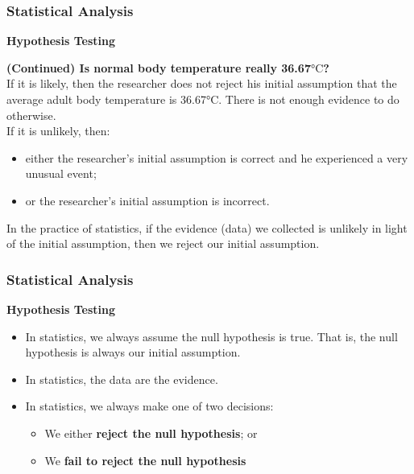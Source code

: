 \documentclass{beamer}
\begin{document}

\begin{frame}
\frametitle{Statistical Analysis}
\textbf{Hypothesis Testing}\\
\begin{example}
\textbf{(Continued) Is normal body temperature really 36.67$\si{\degreeCelsius}$?}\\
\vspace{0.1cm}
If it is likely, then the researcher does not reject his initial assumption that the average adult body temperature is 36.67$\si{\degreeCelsius}$. There is not enough evidence to do otherwise.\\
\vspace{0.1cm}
If it is unlikely, then:
\begin{itemize}
\item either the researcher's initial assumption is correct and he experienced a very unusual event;
\item or the researcher's initial assumption is incorrect.
\end{itemize}
\vspace{0.1cm}
In the practice of statistics, if the evidence (data) we collected is unlikely in light of the initial assumption, then we reject our initial assumption.
\end{example}
\end{frame}


\begin{frame}
\frametitle{Statistical Analysis}
\textbf{Hypothesis Testing}\\
\vspace{0.5cm}
\begin{itemize}
\item In statistics, we always assume the null hypothesis is true. That is, the null hypothesis is always our initial assumption.
\vspace{0.5cm}
\item In statistics, the data are the evidence.
\vspace{0.5cm}
\item In statistics, we always make one of two decisions:
\vspace{0.2cm} 
\begin{itemize}
\item We either \textbf{reject the null hypothesis}; or
\vspace{0.2cm}
\item We \textbf{fail to reject the null hypothesis}
\end{itemize}
\end{itemize}
\end{frame}
\end{document}
